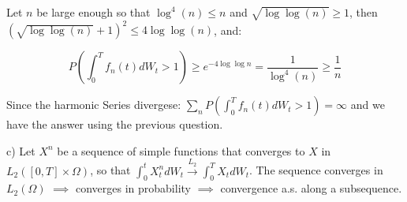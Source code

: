 \documentclass[11pt]{article}
\begin{document}
Let \(n\) be large enough so that \(\log^4(n) \le n\) and \(\sqrt{\log \log(n)} \ge 1\), then \((\sqrt{\log \log(n)} + 1)^2 \le 4 \log \log (n)\), and:

$$P(\int_0^T f_n(t) dW_t > 1)  \ge e^{-4\log \log n} = \frac{1}{\log^4(n)} \ge \frac1n$$

Since the harmonic Series divergese: \(\sum_n P(\int_0^T f_n(t) dW_t > 1) = \infty\) and we have the answer using the previous question.

c)
Let \(X^n\) be a sequence of simple functions that converges to \(X\) in \(L_2([0, T] \times \Omega)\), so that \(\int_0^t X_t^n dW_t \overset{L_2}{\rightarrow} \int_0^T X_t dW_t\).
The sequence converges in \(L_2(\Omega)\) \(\implies\) converges in probability \(\implies\) convergence a.s. along a subsequence.
\end{document}
